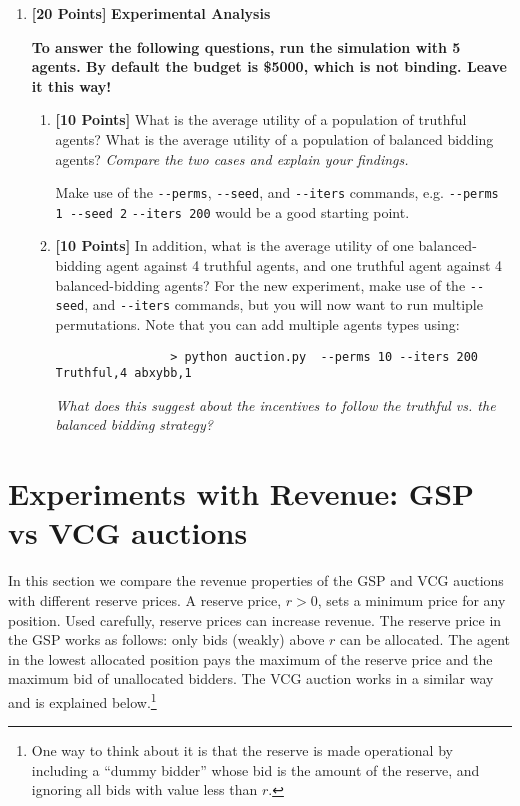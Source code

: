 \documentclass[11pt]{article}
\newcommand{\points}[1]{\textbf{[#1 Points]}}
\begin{document}
\begin{enumerate}
		\item \points{20} {\bf Experimental Analysis}

{\bf 			To answer the following questions, run the
			simulation with 5 agents. By default the
			budget is \$5000, which is
not binding. Leave it
			this way!}
		
			\begin{enumerate}			
				\item \points{10} What is the average utility of a population of truthful agents? What is the average utility of a population of balanced bidding agents? {\em  Compare the two cases and explain your findings.}


				Make use of the \verb+--perms+, \verb+--seed+, and \verb+--iters+ commands, e.g. \verb+--perms 1 --seed 2+ \verb+--iters 200+ would be a good starting point.

				\item \points{10} In addition, what is the
average utility of one balanced-bidding agent against 4 truthful agents, and
one truthful agent against 4 balanced-bidding agents?
For the new experiment,
make use of the \verb+--seed+, and \verb+--iters+ commands, but you will now
want to run multiple permutations. Note that you can add multiple agents types using:
			\begin{verbatim}
				> python auction.py  --perms 10 --iters 200 Truthful,4 abxybb,1
			\end{verbatim}
%

{\em What does this suggest about the incentives to follow the truthful vs. the balanced bidding strategy?}
			\end{enumerate}

\end{enumerate}

\section{Experiments with Revenue: GSP vs VCG auctions}

In this section we compare the revenue properties of the GSP and VCG
auctions with different reserve prices.
%
A reserve price, $r>0$, sets a minimum price for any position.  Used
carefully, reserve prices can increase revenue.
%
The reserve price in the GSP works as follows: only bids (weakly)
above $r$ can be allocated.  The agent in the lowest allocated
position pays the maximum of the reserve price and the maximum bid of
unallocated bidders. The VCG auction works in a similar way and is
explained below.\footnote{One way to think about it is that the
  reserve is made operational by including a ``dummy bidder'' whose
  bid is the amount of the reserve, and ignoring all bids with value
  less than $r$.}
\end{document}
